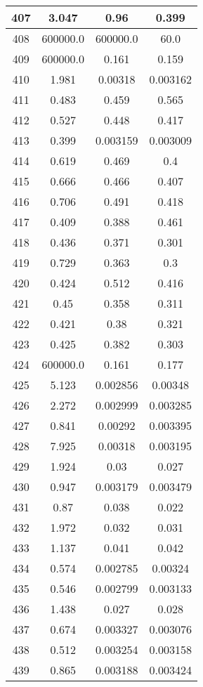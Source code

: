\begin{table}[H]
\begin{tabular}{|c|c|c|c|}
\hline
407 & 3.047 & 0.96 & 0.399 \\
\hline
408 & 600000.0 & 600000.0 & 60.0 \\
\hline
409 & 600000.0 & 0.161 & 0.159 \\
\hline
410 & 1.981 & 0.00318 & 0.003162 \\
\hline
411 & 0.483 & 0.459 & 0.565 \\
\hline
412 & 0.527 & 0.448 & 0.417 \\
\hline
413 & 0.399 & 0.003159 & 0.003009 \\
\hline
414 & 0.619 & 0.469 & 0.4 \\
\hline
415 & 0.666 & 0.466 & 0.407 \\
\hline
416 & 0.706 & 0.491 & 0.418 \\
\hline
417 & 0.409 & 0.388 & 0.461 \\
\hline
418 & 0.436 & 0.371 & 0.301 \\
\hline
419 & 0.729 & 0.363 & 0.3 \\
\hline
420 & 0.424 & 0.512 & 0.416 \\
\hline
421 & 0.45 & 0.358 & 0.311 \\
\hline
422 & 0.421 & 0.38 & 0.321 \\
\hline
423 & 0.425 & 0.382 & 0.303 \\
\hline
424 & 600000.0 & 0.161 & 0.177 \\
\hline
425 & 5.123 & 0.002856 & 0.00348 \\
\hline
426 & 2.272 & 0.002999 & 0.003285 \\
\hline
427 & 0.841 & 0.00292 & 0.003395 \\
\hline
428 & 7.925 & 0.00318 & 0.003195 \\
\hline
429 & 1.924 & 0.03 & 0.027 \\
\hline
430 & 0.947 & 0.003179 & 0.003479 \\
\hline
431 & 0.87 & 0.038 & 0.022 \\
\hline
432 & 1.972 & 0.032 & 0.031 \\
\hline
433 & 1.137 & 0.041 & 0.042 \\
\hline
434 & 0.574 & 0.002785 & 0.00324 \\
\hline
435 & 0.546 & 0.002799 & 0.003133 \\
\hline
436 & 1.438 & 0.027 & 0.028 \\
\hline
437 & 0.674 & 0.003327 & 0.003076 \\
\hline
438 & 0.512 & 0.003254 & 0.003158 \\
\hline
439 & 0.865 & 0.003188 & 0.003424 \\

\end{tabular}
\end{table}
